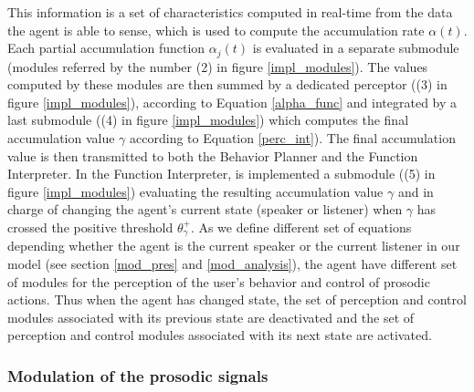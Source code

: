 This information is a set of characteristics computed in real-time from the data the agent is able to sense, which is used to compute the accumulation rate $\alpha(t)$. 
Each partial accumulation function $\alpha_j(t)$ is evaluated in a separate submodule (modules referred by the number (2) in figure \ref{impl_modules}). The values computed by these modules are then summed by a dedicated perceptor ((3) in figure \ref{impl_modules}), according to Equation \ref{alpha_func} and integrated by a last submodule ((4) in figure \ref{impl_modules}) which computes the final accumulation value $\gamma$ according to Equation \ref{perc_int}). The final accumulation value is then transmitted to both the Behavior Planner and the Function Interpreter. In the Function Interpreter, is implemented a submodule ((5) in figure \ref{impl_modules}) evaluating the resulting accumulation value $\gamma$ and in charge of changing the agent's current state (speaker or listener) when $\gamma$ has crossed the positive threshold $\theta_{\gamma}^{+}$. As we define different set of equations depending whether the agent is the current speaker or the current listener in our model (see section \ref{mod_pres} and \ref{mod_analysis}), the agent have different set of modules for the perception of the user's behavior and control of prosodic actions. Thus when the agent has changed state, the set of perception and control modules associated with its previous state are deactivated and the set of perception and control modules associated with its next state are activated. 


\subsubsection{Modulation of the prosodic signals}

